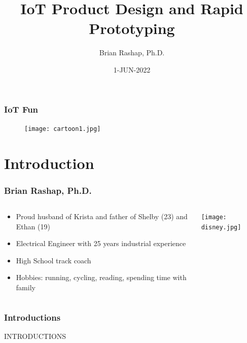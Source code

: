 \documentclass{beamer}
\begin{document}
\title{IoT Product Design and Rapid Prototyping}
\author{Brian Rashap, Ph.D.}
\date{1-JUN-2022} 



\begin{frame}
\titlepage
\end{frame}

\begin{frame}\frametitle{IoT Fun}
\begin{figure}[h]
	\texttt{[image: cartoon1.jpg]}
\end{figure}
\end{frame}


\section{Introduction}


\begin{frame}
\frametitle{Brian Rashap, Ph.D.}
\begin{columns}
\begin{column}{5cm}
\begin{itemize}
\item Proud husband of Krista and father of Shelby (23) and Ethan (19)
\item Electrical Engineer with 25 years industrial experience
\item High School track coach
\item Hobbies: running, cycling, reading, spending time with family
\end{itemize}
\vspace{1cm} 
\end{column}
\begin{column}{4cm}
\begin{overprint}
\texttt{[image: disney.jpg]}
\end{overprint}
\end{column}
\end{columns}
\end{frame}

\begin{frame}\frametitle{Introductions}
INTRODUCTIONS
\end{frame}
\end{document}
